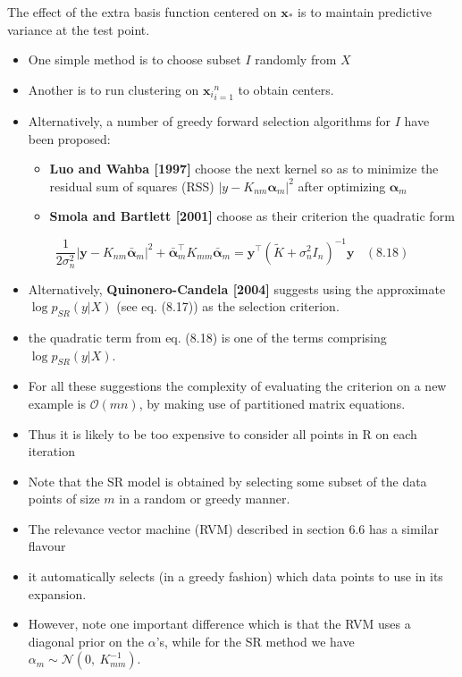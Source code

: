 \documentclass[
  ignorenonframetext,
]{beamer}
\begin{document}
\begin{frame}{}
\protect\hypertarget{section-12}{}
The effect of the extra basis function centered on \(\pmb x_*\) is to
maintain predictive variance at the test point.

\begin{itemize}
\item
  One simple method is to choose subset \(I\) randomly from \(X\)
\item
  Another is to run clustering on \({\pmb x_i}^n_{i=1}\) to obtain
  centers.
\item
  Alternatively, a number of greedy forward selection algorithms for
  \(I\) have been proposed:

  \begin{itemize}
  \item
    \textbf{Luo and Wahba {[}1997{]}} choose the next kernel so as to
    minimize the residual sum of squares (RSS)
    \(|y -K_{nm} \pmb \alpha_m|^2\) after optimizing \(\pmb \alpha_m\)
  \item
    \textbf{Smola and Bartlett {[}2001{]}} choose as their criterion the
    quadratic form
  \end{itemize}
\end{itemize}

\[
{\frac 1 {2 \sigma_n^2}} |\pmb y - K_{nm} \pmb {\bar \alpha}_m|^2 + 
\pmb {\bar \alpha}_m ^{\top} K_{mm} \pmb {\bar \alpha}_m  =
\pmb y^{\top} ({\tilde K} +  \sigma_n^2I_n)^{-1} \pmb y \ \ \ \ (8.18)
\]
\end{frame}

\begin{frame}{}
\protect\hypertarget{section-13}{}
\begin{itemize}
\item
  Alternatively, \textbf{Quinonero-Candela {[}2004{]}} suggests using
  the approximate \(\log p_{SR}(y|X)\) (see eq. (8.17)) as the selection
  criterion.
\item
  the quadratic term from eq. (8.18) is one of the terms comprising
  \(\log p_{SR}(y|X)\).
\item
  For all these suggestions the complexity of evaluating the criterion
  on a new example is \(\mathcal O(mn)\), by making use of partitioned
  matrix equations.
\item
  Thus it is likely to be too expensive to consider all points in R on
  each iteration
\item
  Note that the SR model is obtained by selecting some subset of the
  data points of size \(m\) in a random or greedy manner.
\item
  The relevance vector machine (RVM) described in section 6.6 has a
  similar flavour
\item
  it automatically selects (in a greedy fashion) which data points to
  use in its expansion.
\item
  However, note one important difference which is that the RVM uses a
  diagonal prior on the \(\alpha\)'s, while for the SR method we have
  \(\alpha_m \sim \mathcal N (0,\  K_{mm}^{-1})\).
\end{itemize}
\end{frame}
\end{document}

